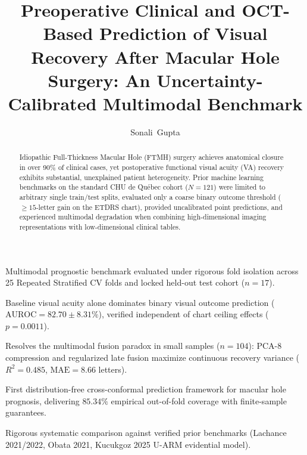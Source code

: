 \documentclass[preprint,12pt]{elsarticle}
\begin{document}
\begin{frontmatter}

\title{Preoperative Clinical and OCT-Based Prediction of Visual Recovery After Macular Hole Surgery: An Uncertainty-Calibrated Multimodal Benchmark}

\author[inst1]{Sonali~Gupta}



\begin{highlights}
\item Multimodal prognostic benchmark evaluated under rigorous fold isolation across 25 Repeated Stratified CV folds and locked held-out test cohort ($n=17$).
\item Baseline visual acuity alone dominates binary visual outcome prediction ($\text{AUROC} = 82.70 \pm 8.31\%$), verified independent of chart ceiling effects ($p=0.0011$).
\item Resolves the multimodal fusion paradox in small samples ($n=104$): PCA-8 compression and regularized late fusion maximize continuous recovery variance ($R^2 = 0.485$, $\text{MAE} = 8.66$ letters).
\item First distribution-free cross-conformal prediction framework for macular hole prognosis, delivering $85.34\%$ empirical out-of-fold coverage with finite-sample guarantees.
\item Rigorous systematic comparison against verified prior benchmarks (Lachance 2021/2022, Obata 2021, Kucukgoz 2025 U-ARM evidential model).
\end{highlights}

\begin{abstract}
Idiopathic Full-Thickness Macular Hole (FTMH) surgery achieves anatomical closure in over 90\% of clinical cases, yet postoperative functional visual acuity (VA) recovery exhibits substantial, unexplained patient heterogeneity. Prior machine learning benchmarks on the standard CHU de Qu\'{e}bec cohort ($N=121$) were limited to arbitrary single train/test splits, evaluated only a coarse binary outcome threshold ($\ge 15$-letter gain on the ETDRS chart), provided uncalibrated point predictions, and experienced multimodal degradation when combining high-dimensional imaging representations with low-dimensional clinical tables. 


\end{abstract}
\end{frontmatter}
\end{document}
